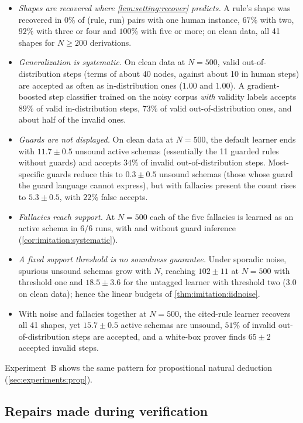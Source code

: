 \begin{itemize}
\item \emph{Shapes are recovered where \cref{lem:setting:recover} predicts.} A rule's shape was recovered in $0\%$ of (rule, run) pairs with one human instance, $67\%$ with two, $92\%$ with three or four and $100\%$ with five or more; on clean data, all 41 shapes for $N\ge200$ derivations.
\item \emph{Generalization is systematic.} On clean data at $N=500$, valid out-of-distribution steps (terms of about 40 nodes, against about 10 in human steps) are accepted as often as in-distribution ones ($1.00$ and $1.00$). A gradient-boosted step classifier trained on the noisy corpus \emph{with} validity labels accepts $89\%$ of valid in-distribution steps, $73\%$ of valid out-of-distribution ones, and about half of the invalid ones.
\item \emph{Guards are not displayed.} On clean data at $N=500$, the default learner ends with $11.7\pm0.5$ unsound active schemas (essentially the 11 guarded rules without guards) and accepts $34\%$ of invalid out-of-distribution steps. Most-specific guards reduce this to $0.3\pm0.5$ unsound schemas (those whose guard the guard language cannot express), but with fallacies present the count rises to $5.3\pm0.5$, with $22\%$ false accepts.
\item \emph{Fallacies reach support.} At $N=500$ each of the five fallacies is learned as an active schema in $6/6$ runs, with and without guard inference (\cref{cor:imitation:systematic}).
\item \emph{A fixed support threshold is no soundness guarantee.} Under sporadic noise, spurious unsound schemas grow with $N$, reaching $102\pm11$ at $N=500$ with threshold one and $18.5\pm3.6$ for the untagged learner with threshold two ($3.0$ on clean data); hence the linear budgets of \cref{thm:imitation:iidnoise}.
\item With noise and fallacies together at $N=500$, the cited-rule learner recovers all 41 shapes, yet $15.7\pm0.5$ active schemas are unsound, $51\%$ of invalid out-of-distribution steps are accepted, and a white-box prover finds $65\pm2$ accepted invalid steps.
\end{itemize}
Experiment~B shows the same pattern for propositional natural deduction (\cref{sec:experiments:prop}).

\subsection{Repairs made during verification}\label{app:imitation:repairs}

